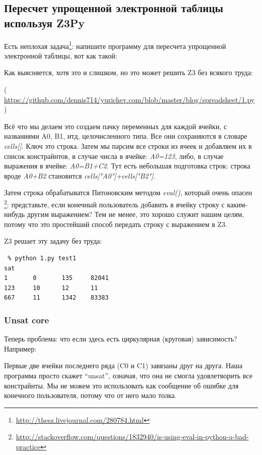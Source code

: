\subsection{Пересчет упрощенной электронной таблицы используя Z3Py}

Есть неплохая задача\footnote{\url{http://thesz.livejournal.com/280784.html}}:
напишите программу для пересчета упрощенной электронной таблицы, вот как такой:



Как выясняется, хотя это и слишком, но это может решить Z3 без всякого труда:



( \url{https://github.com/dennis714/yurichev.com/blob/master/blog/spreadsheet/1.py} )

Всё что мы делаем это создаем пачку переменных для каждой ячейки, с названиями 
A0, B1, итд, целочисленного типа.
Все они сохраняются в словаре \textit{cells[]}.
Ключ это строка.
Затем мы парсим все строки из ячеек и добавляем их в список констрайнтов, в случае числа в ячейке: \textit{A0=123},
либо, в случае выражения в ячейке: \textit{A0=B1+C2}.
Тут есть небольшая подготовка строк: строка вроде \textit{A0+B2} становится \textit{cells["A0"]+cells["B2"]}.

Затем строка обрабатыватся Питоновским методом \textit{eval()}, который очень опасен
\footnote{\url{http://stackoverflow.com/questions/1832940/is-using-eval-in-python-a-bad-practice}}:
представьте, если конечный пользователь добавить в ячейку строку с каким-нибудь другим выражением?
Тем не менее, это хорошо служит нашим целям, потому что это простейший способ передать строку с выражением в Z3.

Z3 решает эту задачу без труда:

\begin{lstlisting}
 % python 1.py test1
sat
1       0       135     82041
123     10      12      11
667     11      1342    83383
\end{lstlisting}

\subsubsection{Unsat core}

Теперь проблема: что если здесь есть циркулярная (круговая) зависимость? Например:



Первые две ячейки последнего ряда (C0 и C1) завязаны друг на друга.
Наша программа просто скажет ``unsat'', означая, что она не смогла удовлетворить все констрайнты.
Мы не можем это использовать как сообщение об ошибке для конечного пользователя, потому что от него мало толка.

